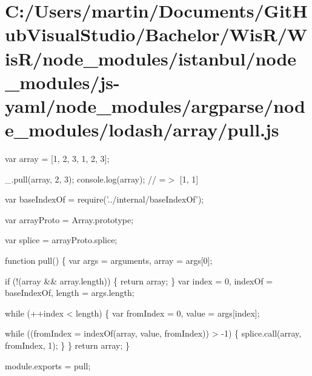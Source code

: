 \hypertarget{_c_1_2_users_2martin_2_documents_2_git_hub_visual_studio_2_bachelor_2_wis_r_2_wis_r_2node_module68da43de61aa0051b8d8b14070aeb995}{}\section{C\+:/\+Users/martin/\+Documents/\+Git\+Hub\+Visual\+Studio/\+Bachelor/\+Wis\+R/\+Wis\+R/node\+\_\+modules/istanbul/node\+\_\+modules/js-\/yaml/node\+\_\+modules/argparse/node\+\_\+modules/lodash/array/pull.\+js}
var array = \mbox{[}1, 2, 3, 1, 2, 3\mbox{]};

\+\_\+.\+pull(array, 2, 3); console.\+log(array); // =$>$ \mbox{[}1, 1\mbox{]}


\begin{DoxyCodeInclude}
var baseIndexOf = require(\textcolor{stringliteral}{'../internal/baseIndexOf'});

var arrayProto = Array.prototype;

var splice = arrayProto.splice;

\textcolor{keyword}{function} pull() \{
  var args = arguments,
      array = args[0];

  \textcolor{keywordflow}{if} (!(array && array.length)) \{
    \textcolor{keywordflow}{return} array;
  \}
  var index = 0,
      indexOf = baseIndexOf,
      length = args.length;

  \textcolor{keywordflow}{while} (++index < length) \{
    var fromIndex = 0,
        value = args[index];

    \textcolor{keywordflow}{while} ((fromIndex = indexOf(array, value, fromIndex)) > -1) \{
      splice.call(array, fromIndex, 1);
    \}
  \}
  \textcolor{keywordflow}{return} array;
\}

module.exports = pull;
\end{DoxyCodeInclude}
 